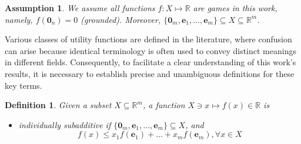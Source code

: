 \documentclass[11pt]{article}\usepackage[]{graphicx}\usepackage[]{xcolor}
\newtheorem{deff}{Definition}
\newtheorem{assumption}{Assumption}
\begin{document}
\begin{assumption}
We assume all functions $f: X\mapsto \mathbb{R}$ are games in this work, namely, $f\left(\mathbf{0}_n\right)=0$ (grounded). Moreover, $\{\mathbf{0}_m, \mathbf{e}_1,\dots, \mathbf{e}_m\}\subseteq X\subseteq \mathbb{R}^m$.
\end{assumption}

Various classes of utility functions are defined in the literature, where confusion can arise because identical terminology is often used to convey distinct meanings in different fields. Consequently, to facilitate a clear understanding of this work's results, it is necessary to establish precise and unambiguous definitions for these key terms.

\begin{deff}\label{deff:varity} Given a subset $X\subseteq \mathbb{R}^m$, a function $X \ni x\mapsto f(x)\in\mathbb{R}$ is 
\begin{itemize}
\item individually subadditive if $\{\mathbf{0}_m, \mathbf{e}_1,\dots, \mathbf{e}_m\}\subseteq X$, and 
\begin{equation}\label{deff:is}
f(x)\le x_1f(\mathbf{e}_1)+\dots+x_mf(\mathbf{e}_m), \forall x\in X
\end{equation}


\end{itemize}
\end{deff}
\end{document}
